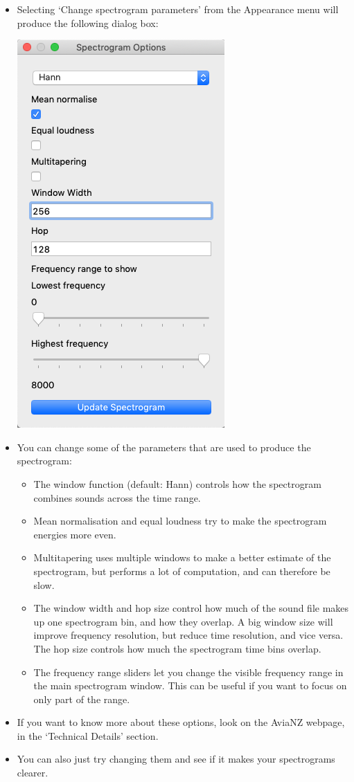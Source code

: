 \documentclass{article}
\begin{document}
\begin{itemize}
\item Selecting `Change spectrogram parameters' from the Appearance menu will produce the following dialog box:

\begin{center}
    \includegraphics[width=.4\textwidth]{Figs/spectrogramoptions}
\end{center}

\item You can change some of the parameters that are used to produce the spectrogram:

\begin{itemize}
\item The window function (default: Hann) controls how the spectrogram combines sounds across the time range.
\item Mean normalisation and equal loudness try to make the spectrogram energies more even.
\item Multitapering uses multiple windows to make a better estimate of the spectrogram, but performs a lot of computation, and can therefore be slow.
\item The window width and hop size control how much of the sound file makes up one spectrogram bin, and how they overlap. A big window size will improve frequency resolution, but reduce time resolution, and vice versa. The hop size controls how much the spectrogram time bins overlap. 
\item The frequency range sliders let you change the visible frequency range in the main spectrogram window. This can be useful if you want to focus on only part of the range.
\end{itemize}

\item If you want to know more about these options, look on the AviaNZ webpage, in the `Technical Details' section. 
\item You can also just try changing them and see if it makes your spectrograms clearer.
\end{itemize}
\end{document}
